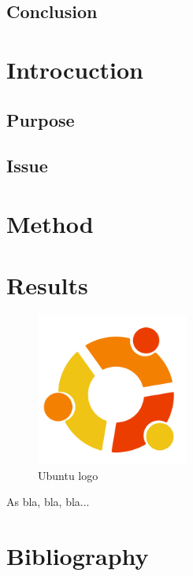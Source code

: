 \documentclass[11pt]{article}
\begin{document}
\subsection*{Conclusion}

\tableofcontents

\section{Introcuction}

\subsection{Purpose}

\subsection{Issue}

\section{Method}

\section{Results}

\begin{figure}[h]
  \centering
  \includegraphics[width=5cm]{graphics/ubuntu.png}
  \caption{Ubuntu logo}
\end{figure}

As \cite{FeatureSelection2020} bla, bla, bla...\\

\section{Bibliography}

\printbibliography
\end{document}
